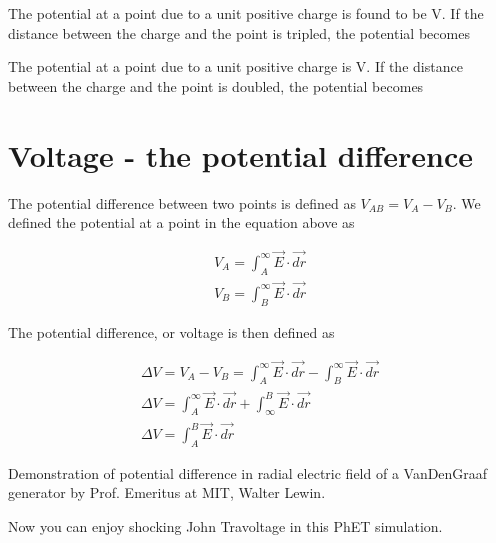 \documentclass{ximera}
\begin{document}
The potential at a point due to a unit positive charge is found to be V.  If the distance between the charge and the point is tripled, the potential becomes 

\begin{question}  
The potential at a point due to a unit positive charge is  V.  If the distance between the charge and the point is doubled, the potential becomes 
\begin{multipleChoice}  
\end{multipleChoice}  
\end{question}



\section{Voltage - the potential difference}

The potential difference between two points is  defined as $V_{AB}=V_A-V_B$. We defined the potential at a point in the equation above as


\begin{eqnarray}
V_A=\int_{A}^{\infty}  \vec{E} \cdot \vec{dr} \\
V_B=\int_{B}^{\infty}  \vec{E} \cdot \vec{dr} 
\end{eqnarray}

The potential difference, or voltage is then defined as


\begin{eqnarray}
\Delta V = V_A - V_B =\int_{A}^{\infty}  \vec{E} \cdot \vec{dr} -\int_{B}^{\infty}  \vec{E} \cdot \vec{dr}  \\
\Delta V = \int_{A}^{\infty}  \vec{E} \cdot \vec{dr} +\int_{\infty}^{B}  \vec{E} \cdot \vec{dr} \\
\Delta V = \int_{A}^{B} \vec{E} \cdot \vec{dr} 
\end{eqnarray}

Demonstration of potential difference in radial electric field of a VanDenGraaf generator by Prof. Emeritus at MIT, Walter Lewin.
\begin{center}  
\end{center}


Now you can enjoy shocking John Travoltage in this PhET simulation. 



\begin{center}  
\end{center} 
\end{document}
